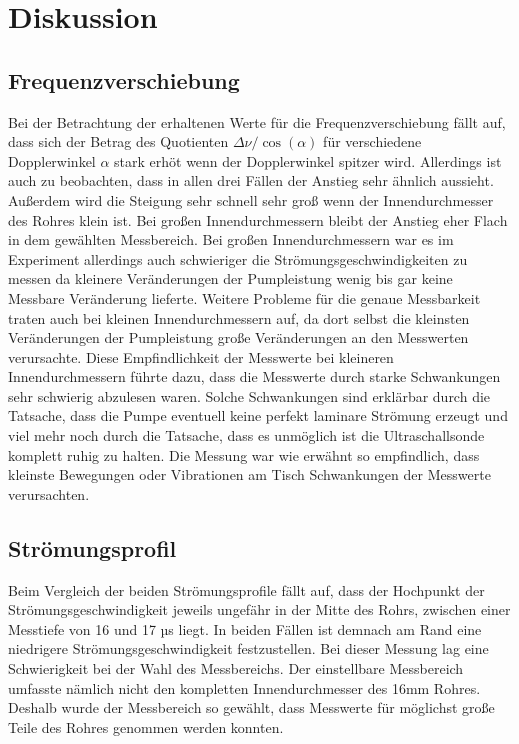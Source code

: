 \documentclass[titlepage=firstcover, captions=tableheading]{scrartcl}
\begin{document}
\section{Diskussion}

\subsection{Frequenzverschiebung}

\noindent Bei der Betrachtung der erhaltenen Werte für die Frequenzverschiebung fällt auf, dass sich der Betrag des Quotienten $\Delta \nu / \cos(\alpha)$ für verschiedene Dopplerwinkel $\alpha$ stark erhöt wenn der Dopplerwinkel spitzer wird. Allerdings ist auch zu beobachten, dass in allen drei Fällen der Anstieg sehr ähnlich aussieht. Außerdem wird die Steigung sehr schnell sehr groß wenn der Innendurchmesser des Rohres klein ist. Bei großen Innendurchmessern bleibt der Anstieg eher Flach in dem gewählten Messbereich. 
\noindent Bei großen Innendurchmessern war es im Experiment allerdings auch schwieriger die Strömungsgeschwindigkeiten zu messen da kleinere Veränderungen der Pumpleistung wenig bis gar keine Messbare Veränderung lieferte.
Weitere Probleme für die genaue Messbarkeit traten auch bei kleinen Innendurchmessern auf, da dort selbst die kleinsten Veränderungen der Pumpleistung große Veränderungen an den Messwerten verursachte. Diese Empfindlichkeit der Messwerte bei kleineren Innendurchmessern führte dazu, dass die Messwerte durch starke Schwankungen sehr schwierig abzulesen waren. Solche Schwankungen sind erklärbar durch die Tatsache, dass die Pumpe eventuell keine perfekt laminare Strömung erzeugt und viel mehr noch durch die Tatsache, dass es unmöglich ist die Ultraschallsonde komplett ruhig zu halten. Die Messung war wie erwähnt so empfindlich, dass kleinste Bewegungen oder Vibrationen am Tisch Schwankungen der Messwerte verursachten.

\subsection{Strömungsprofil}

Beim Vergleich der beiden Strömungsprofile fällt auf, dass der Hochpunkt der Strömungsgeschwindigkeit jeweils ungefähr in der Mitte des Rohrs, zwischen einer Messtiefe von 16 und 17 µs liegt. In beiden Fällen ist demnach am Rand eine niedrigere Strömungsgeschwindigkeit festzustellen. 
Bei dieser Messung lag eine Schwierigkeit bei der Wahl des Messbereichs. Der einstellbare Messbereich umfasste nämlich nicht den kompletten Innendurchmesser des 16mm Rohres. Deshalb wurde der Messbereich so gewählt, dass Messwerte für möglichst große Teile des Rohres genommen werden konnten.  
\end{document}
